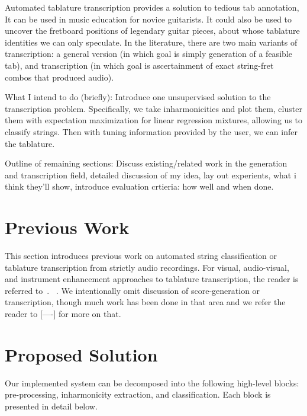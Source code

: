 \documentclass[12pt]{cmuthesis}
\begin{document}
Automated tablature transcription provides a solution to tedious tab annotation, It can be used in music education for novice guitarists. It could also be used to uncover the fretboard positions of legendary guitar pieces, about whose tablature identities we can only speculate. In the literature, there are two main variants of transcription: a general version (in which goal is simply generation of a feasible tab), and transcription (in which goal is ascertainment of exact string-fret combos that produced audio).

What I intend to do (briefly): Introduce one unsupervised solution to the transcription problem. Specifically, we take inharmonicities and plot them, cluster them with expectation maximization for linear regression mixtures, allowing us to classify strings. Then with tuning information provided by the user, we can infer the tablature.

Outline of remaining sections: Discuss existing/related work in the generation and transcription field, detailed discussion of my idea, lay out experients, what i think they'll show, introduce evaluation crtieria: how well and when done.

\singlespacing


\chapter{Previous Work}
\doublespacing
This section introduces previous work on automated string classification or tablature transcription from strictly audio recordings. For visual, audio-visual, and instrument enhancement approaches to tablature transcription, the reader is referred to~\cite{ogrady2009, hrybyk2010}. ~\cite{abesser2012}. We intentionally omit discussion of score-generation or transcription, though much work has been done in that area and we refer the reader to [----] for more on that. \cite{barbanchoa2012,barbanchoi2012}
\cite{barbancho2009}

\singlespacing

\chapter{Proposed Solution}
\doublespacing
Our implemented system can be decomposed into the following high-level blocks: pre-processing, inharmonicity extraction, and classification. Each block is presented in detail below.
\end{document}
